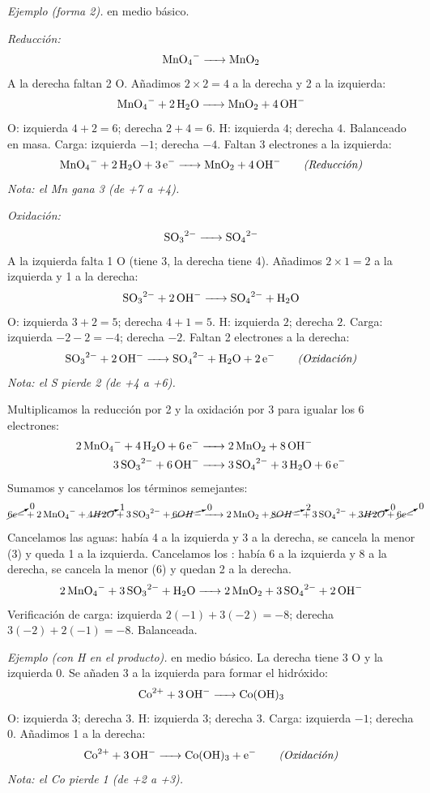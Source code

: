 \textit{Ejemplo (forma 2).} 
en medio básico.

\textit{Reducción:}
\[
\ce{MnO4- -> MnO2}
\]
A la derecha faltan 2 O. Añadimos $2 \times 2 = 4$  a la
derecha y 2  a la izquierda:
\[
\ce{MnO4- + 2H2O -> MnO2 + 4OH-}
\]
O: izquierda $4+2=6$; derecha $2+4=6$. H: izquierda $4$;
derecha $4$. Balanceado en masa. Carga: izquierda $-1$; derecha
$-4$. Faltan 3 electrones a la izquierda:
\begin{equation*}
\ce{MnO4- + 2H2O + 3e- -> MnO2 + 4OH-} \tag*{\textit{(Reducción)}}
\end{equation*}
\textit{Nota: el Mn gana 3  (de +7 a +4).}

\textit{Oxidación:}
\[
\ce{SO3^{2-} -> SO4^{2-}}
\]
A la izquierda falta 1 O (tiene 3, la derecha tiene 4). Añadimos
$2 \times 1 = 2$  a la izquierda y 1  a la
derecha:
\[
\ce{SO3^{2-} + 2OH- -> SO4^{2-} + H2O}
\]
O: izquierda $3+2=5$; derecha $4+1=5$. H: izquierda $2$;
derecha $2$. Carga: izquierda $-2-2=-4$; derecha $-2$. Faltan
2 electrones a la derecha:
\begin{equation*}
\ce{SO3^{2-} + 2OH- -> SO4^{2-} + H2O + 2e-} \tag*{\textit{(Oxidación)}}
\end{equation*}
\textit{Nota: el S pierde 2  (de +4 a +6).}

Multiplicamos la reducción por 2 y la oxidación por 3 para
igualar los 6 electrones:
\begin{align*}
\ce{2MnO4- + 4H2O + 6e- &-> 2MnO2 + 8OH-} \\
\ce{3SO3^{2-} + 6OH- &-> 3SO4^{2-} + 3H2O + 6e-}
\end{align*}
Sumamos y cancelamos los términos semejantes:
\[
\ce{
\cancelto{0}{6e-} + 2MnO4- + \cancelto{1}{4H2O} + 3SO3^{2-}
+ \cancelto{0}{6OH-}
-> 2MnO2 + \cancelto{2}{8OH-} + 3SO4^{2-}
+ \cancelto{0}{3H2O} + \cancelto{0}{6e-}
}
\]
Cancelamos las aguas: había 4 a la izquierda y 3 a la derecha,
se cancela la menor (3) y queda 1 a la izquierda. Cancelamos los
: había 6 a la izquierda y 8 a la derecha, se cancela la
menor (6) y quedan 2 a la derecha.
\[
\ce{2MnO4- + 3SO3^{2-} + H2O -> 2MnO2 + 3SO4^{2-} + 2OH-}
\]
Verificación de carga: izquierda $2(-1) + 3(-2) = -8$; derecha
$3(-2) + 2(-1) = -8$. Balanceada.

\textit{Ejemplo (con H en el producto).} 
en medio básico. La derecha tiene 3 O y la izquierda 0. Se añaden
3  a la izquierda para formar el hidróxido:
\[
\ce{Co^{2+} + 3OH- -> Co(OH)3}
\]
O: izquierda $3$; derecha $3$. H: izquierda $3$; derecha $3$.
Carga: izquierda $-1$; derecha $0$. Añadimos 1  a la
derecha:
\begin{equation*}
\ce{Co^{2+} + 3OH- -> Co(OH)3 + e-} \tag*{\textit{(Oxidación)}}
\end{equation*}
\textit{Nota: el Co pierde 1  (de +2 a +3).}

